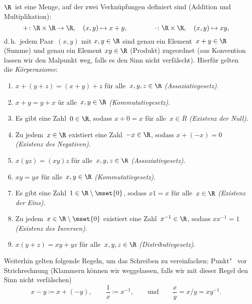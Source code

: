 \documentclass[a4paper]{article}
\begin{document}
\begin{axiom}[Körperaxiome]
    $\R$~ist eine Menge, auf der zwei Verknüpfungen definiert sind (Addition und Multiplikation):
    \begin{equation*}
        +\colon \R \times \R \to \R,\quad (x, y) \mapsto x + y, \qquad\qquad \cdot\colon \R \times \R,\quad (x, y) \mapsto x y,
    \end{equation*}
    d.\,h.\ jedem Paar~$(x, y)$ mit $x, y \in \R$ sind genau ein Element~$x + y \in \R$ (Summe) und genau ein Element $x y \in \R$ (Produkt) zugeordnet (aus Konvention lassen wir den Malpunkt weg, falls es den Sinn nicht verfälscht). Hierfür gelten die \emph{Körperaxiome}:

    \begin{enumerate}[label=\textnormal{(A\arabic*)}, leftmargin=*, widest=(A00), series=axioms]
        \item $x + (y + z) = (x + y) + z$ für alle~$x, y, z \in \R$ \emph{(Assoziativgesetz)}.\label{ax:aa}
        \item $x + y = y + x$ ür alle~$x , y \in \R$ \emph{(Kommutativgesetz)}.\label{ax:ac}
        \item Es gibt eine Zahl~$0 \in \R$, sodass $x+ 0 = x$ für alle~$x \in R$ \emph{(Existenz der Null)}.\label{ax:an}
        \item Zu jedem~$x \in \R$ existiert eine Zahl~$-x \in \R$, sodass $x + (-x) = 0$ \emph{(Existenz des Negativen)}.\label{ax:ai}
        \item $x (y z) = (x y) z$ für alle~$x, y, z \in \R$ \emph{(Assoziativgesetz)}.\label{ax:ma}
        \item $x y = y x$ für alle~$x, y \in \R$ \emph{(Kommutativgesetz)}.\label{ax:mc}
        \item Es gibt eine Zahl~$1 \in \R \setminus \mset{0}$, sodass $x 1 = x$ für alle~$x \in \R$ \emph{(Existenz der Eins)}.\label{ax:mn}
        \item Zu jedem~$x \in \R \setminus \mset{0}$ existiert eine Zahl~$x^{-1} \in \R$, sodass $x x^{-1} = 1$ \emph{(Existenz des Inversen)}.\label{ax:mi}
        \item $x (y + z) = x y + y z$ für alle~$x, y, z \in \R$ \emph{(Distributivgesetz)}.\label{ax:d}
    \end{enumerate}
\end{axiom}

Weiterhin gelten folgende Regeln, um das Schreiben zu vereinfachen: Punkt"~ vor Strichrechnung (Klammern können wir weggelassen, falls wir mit dieser Regel den Sinn nicht verfälschen)
\begin{equation*}
    x - y \coloneqq x + (-y),\qquad \frac{1}{x} \coloneqq x^{-1},\qquad \text{und}\qquad \frac{x}{y} = x/y = x y^{-1}.
\end{equation*}
\end{document}
